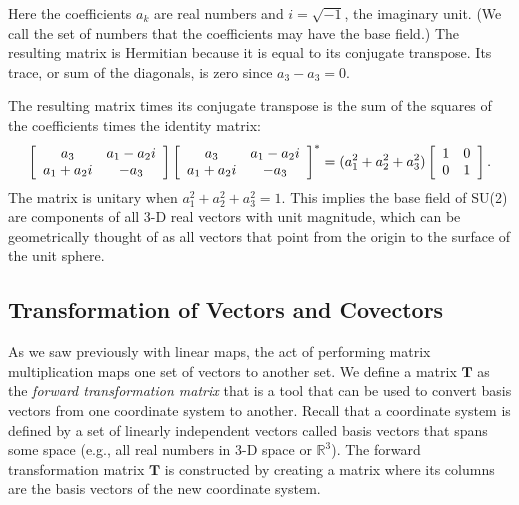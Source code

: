 Here the coefficients $a_k$ are real numbers and $i = \sqrt{-1}$, the imaginary unit. (We call the set of numbers that the coefficients may have the base field.) The resulting matrix is Hermitian because it is equal to its conjugate transpose. Its trace, or sum of the diagonals, is zero since $a_3 - a_3 = 0$.

The resulting matrix times its conjugate transpose is the sum of the squares of the coefficients times the identity matrix:
\begin{align}
 \left[ \begin{array}{c c} 
      a_3 			&  a_1 - a_2 i 	\\ 
      a_1 + a_2 i 	& -a_3 			\\ \end{array} \right] 
    \left[ \begin{array}{c c} 
      a_3 			&  a_1 - a_2 i 	\\ 
      a_1 + a_2 i 	& -a_3 			\\ \end{array} \right]^* 
  = ( a_1^2 + a_2^2 + a_3^2 )     \left[ \begin{array}{c c} 
      1			&  0	\\ 
      0 		& 1		\\ \end{array} \right] .
\end{align}
The matrix is unitary when $a_1^2 + a_2^2 + a_3^2 = 1$. This implies the base field of SU(2) are components of all 3-D real vectors with unit magnitude, which can be geometrically thought of as all vectors that point from the origin to the surface of the unit sphere.

\subsection{Transformation of Vectors and Covectors}

As we saw previously with linear maps, the act of performing matrix multiplication maps one set of vectors to another set. We define a matrix $\mathbf{T}$ as the \emph{forward transformation matrix} that is a tool that can be used to convert basis vectors from one coordinate system to another. Recall that a coordinate system is defined by a set of linearly independent vectors called basis vectors that spans some space (e.g., all real numbers in 3-D space or $\mathbb{R}^3$). The forward transformation matrix $\mathbf{T}$ is constructed by creating a matrix where its columns are the basis vectors of the new coordinate system. 

